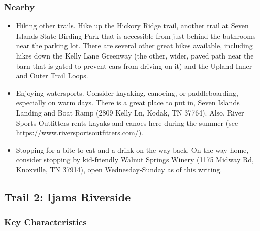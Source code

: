 \documentclass[
  letterpaper,
  DIV=11,
  numbers=noendperiod]{scrartcl}
\providecommand{\tightlist}{%
  \setlength{\itemsep}{0pt}\setlength{\parskip}{0pt}}\usepackage{longtable,booktabs,array}
\begin{document}
\hypertarget{nearby}{%
\subsubsection{Nearby}\label{nearby}}

\begin{itemize}
\tightlist
\item
  Hiking other trails. Hike up the Hickory Ridge trail, another trail at
  Seven Islands State Birding Park that is accessible from just behind
  the bathrooms near the parking lot. There are several other great
  hikes available, including hikes down the Kelly Lane Greenway (the
  other, wider, paved path near the barn that is gated to prevent cars
  from driving on it) and the Upland Inner and Outer Trail Loops.
\item
  Enjoying watersports. Consider kayaking, canoeing, or paddleboarding,
  especially on warm days. There is a great place to put in, Seven
  Islands Landing and Boat Ramp (2809 Kelly Ln, Kodak, TN 37764). Also,
  River Sports Outfitters rents kayaks and canoes here during the summer
  (see \url{https://www.riversportsoutfitters.com/}).\\
\item
  Stopping for a bite to eat and a drink on the way back. On the way
  home, consider stopping by kid-friendly Walnut Springs Winery (1175
  Midway Rd, Knoxville, TN 37914), open Wednesday-Sunday as of this
  writing.
\end{itemize}

\hypertarget{trail-2-ijams-riverside}{%
\subsection{Trail 2: Ijams Riverside}\label{trail-2-ijams-riverside}}

\hypertarget{key-characteristics-1}{%
\subsubsection{Key Characteristics}\label{key-characteristics-1}}
\end{document}
